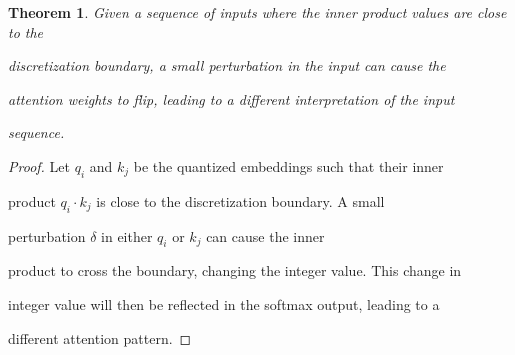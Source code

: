 \documentclass[11pt]{article}
\newtheorem{theorem}{Theorem}[section]
\theoremstyle{definition}
\begin{document}
\begin{theorem}






Given a sequence of inputs where the inner product values are close to the






discretization boundary, a small perturbation in the input can cause the






attention weights to flip, leading to a different interpretation of the input






sequence.






\end{theorem}













\begin{proof}






Let \( q_i \) and \( k_j \) be the quantized embeddings such that their inner






product \( q_i \cdot k_j \) is close to the discretization boundary. A small






perturbation \( \delta \) in either \( q_i \) or \( k_j \) can cause the inner






product to cross the boundary, changing the integer value. This change in






integer value will then be reflected in the softmax output, leading to a






different attention pattern.






\end{proof}
\end{document}
